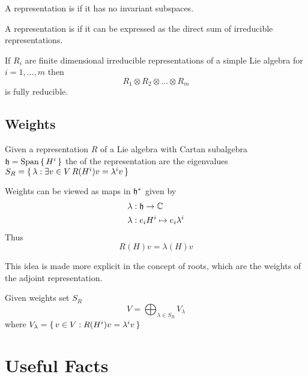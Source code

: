 \documentclass{article}
\begin{document}
\begin{definition}
A representation is  if it has no invariant subspaces. 
\end{definition}

\begin{definition}
A representation is  if it can be expressed as the direct sum of irreducible representations. 
\end{definition}

\begin{fact}
If $R_i$ are finite dimensional irreducible representations of a simple Lie algebra for $i=1,\dots,m$ then
\[
R_1 \otimes R_2 \otimes \dots \otimes R_m
\]
is fully reducible. 
\end{fact}

\subsection{Weights}
\begin{definition}[Weights]
Given a representation $R$ of a Lie algebra with Cartan subalgebra $\mathfrak{h}=\operatorname{Span}\set{ H^i }$ the  of the representation are the eigenvalues $S_R=\set{ \lambda : \exists v\in V \, R(H^i)v=\lambda^i v}$
\end{definition}

\begin{fact}
Weights can be viewed as maps in $\mathfrak{h}^\ast$ given by 
\begin{align*}
\lambda &:\mathfrak{h}\to\mathbb{C} \\
\lambda &: e_i H^i \mapsto e_i \lambda^i
\end{align*}
Thus 
\[
R(H)v=\lambda(H)v
\]
\end{fact}

\begin{idea}
This idea is made more explicit in the concept of roots, which are the weights of the adjoint representation. 
\end{idea}

\begin{fact}
Given weights set $S_R$
\[
V=\bigoplus_{\lambda\in S_R} V_\lambda
\]
where $V_\lambda=\set{ v\in V : R(H^i)v=\lambda^i v}$
\end{fact}
\section{Useful Facts}
\end{document}
